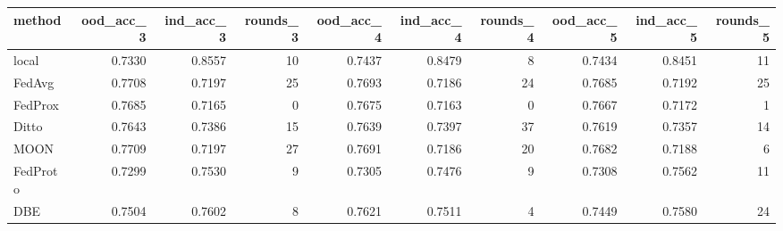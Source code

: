 \begin{tabular}{lrrrrrrrrr}
\toprule
method & ood_acc_3 & ind_acc_3 & rounds_3 & ood_acc_4 & ind_acc_4 & rounds_4 & ood_acc_5 & ind_acc_5 & rounds_5 \\
\midrule
local & 0.7330 & 0.8557 & 10 & 0.7437 & 0.8479 & 8 & 0.7434 & 0.8451 & 11 \\
FedAvg & 0.7708 & 0.7197 & 25 & 0.7693 & 0.7186 & 24 & 0.7685 & 0.7192 & 25 \\
FedProx & 0.7685 & 0.7165 & 0 & 0.7675 & 0.7163 & 0 & 0.7667 & 0.7172 & 1 \\
Ditto & 0.7643 & 0.7386 & 15 & 0.7639 & 0.7397 & 37 & 0.7619 & 0.7357 & 14 \\
MOON & 0.7709 & 0.7197 & 27 & 0.7691 & 0.7186 & 20 & 0.7682 & 0.7188 & 6 \\
FedProto & 0.7299 & 0.7530 & 9 & 0.7305 & 0.7476 & 9 & 0.7308 & 0.7562 & 11 \\
DBE & 0.7504 & 0.7602 & 8 & 0.7621 & 0.7511 & 4 & 0.7449 & 0.7580 & 24 \\
\bottomrule
\end{tabular}
